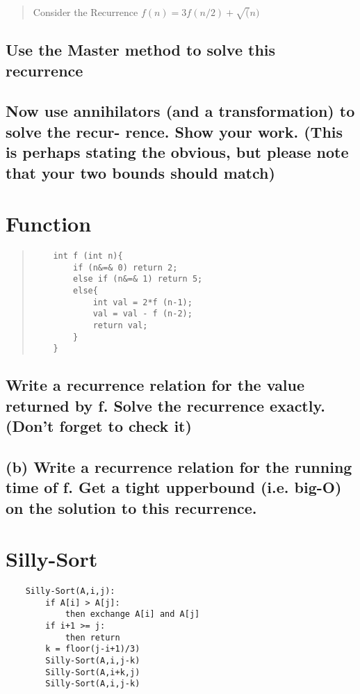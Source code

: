 \documentclass[titlepage]{article}\usepackage[]{graphicx}\usepackage[]{color}
\begin{document}
\begin{quote}
Consider the Recurrence $f(n) = 3f(n/2) + \sqrt(n)$
\end{quote}

\subsection{Use the Master method to solve this recurrence}



\subsection{Now use annihilators (and a transformation) to solve the recur- rence. Show
your work. (This is perhaps stating the obvious, but please note that your two
bounds should match)}




\section{Function}

\begin{quote}
\begin{lstlisting}
	int f (int n){
		if (n&=& 0) return 2;
		else if (n&=& 1) return 5;
		else{
			int val = 2*f (n-1);
			val = val - f (n-2);
			return val;
		}
	}
\end{lstlisting}
\end{quote}

\subsection{Write a recurrence relation for the value returned by f. Solve the
recurrence exactly. (Don’t forget to check it)}



\subsection{(b) Write a recurrence relation for the running time of f. Get a tight
upperbound (i.e. big-O) on the solution to this recurrence.}



\section{Silly-Sort }
\begin{lstlisting}
	Silly-Sort(A,i,j):
		if A[i] > A[j]:
			then exchange A[i] and A[j]
		if i+1 >= j:
			then return
		k = floor(j-i+1)/3)
		Silly-Sort(A,i,j-k)
		Silly-Sort(A,i+k,j)
		Silly-Sort(A,i,j-k)
	
\end{lstlisting}
\end{document}
